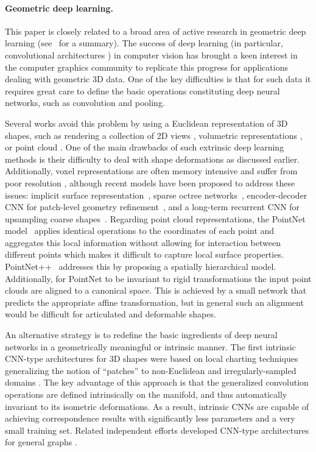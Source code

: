 \paragraph{Geometric deep learning.} 
This paper is closely related to a broad area of active research in geometric deep learning (see~\cite{gdl} for a summary). The success of deep learning (in particular, convolutional architectures \cite{lecun1998gradient}) in computer vision has brought a keen interest in the computer graphics community to replicate this progress for applications dealing with geometric 3D data. One of the key difficulties is that for such data it requires great care to define the basic operations constituting deep neural networks, such as convolution and pooling.

Several works avoid this problem by using a Euclidean representation of 3D shapes, such as rendering a collection of 2D views \cite{su2015multi,wei2016dense}, volumetric representations \cite{wu20153d}, or point cloud \cite{qi2016pointnet,qi2017pointnet++}. One of the main drawbacks of such extrinsic deep learning methods is their difficulty to deal with shape deformations as discussed earlier. Additionally, voxel representations are often memory intensive and suffer from poor resolution \cite{wu20153d}, although recent models have been proposed to address these issues: implicit surface representation~\cite{dai2016shape}, sparse octree networks~\cite{wang17ocnn,riegler17cvpr}, encoder-decoder CNN for patch-level geometry refinement~\cite{han17iccv}, and a long-term recurrent CNN for upsampling coarse shapes~\cite{wang17iccv}. Regarding point cloud representations, the PointNet model~\cite{qi2016pointnet} applies identical operations to the coordinates of each point and aggregates this local information without allowing for interaction between different points which makes it difficult to capture local surface properties. PointNet++~\cite{qi2017pointnet++} addresses this by proposing a spatially hierarchical model. Additionally, for PointNet to be invariant to rigid transformations the input point clouds are aligned to a canonical space. This is achieved by a small network that predicts the appropriate affine transformation, but in general such an alignment would be difficult for articulated and deformable shapes.

An alternative strategy is to redefine the basic ingredients of deep neural networks in a geometrically meaningful or intrinsic manner. The first intrinsic CNN-type architectures for 3D shapes were based on local charting techniques generalizing the notion of ``patches'' to non-Euclidean and irregularly-sampled domains \cite{masci15,boscaini2016learning,monet}. The key advantage of this approach is that the generalized convolution operations are defined intrinsically on the manifold, and thus automatically invariant to its isometric deformations. As a result, intrinsic CNNs are capable of achieving correspondence results with significantly less parameters and a very small training set. Related independent efforts developed CNN-type architectures for general graphs \cite{bruna2013spectral,henaff2015deep,defferrard2016convolutional,kipf2016semi,monet,levie2017cayleynets}. 

